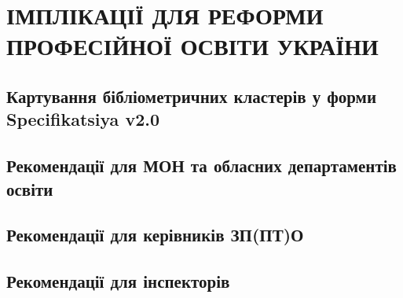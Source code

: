 
\section{\MakeUppercase{Імплікації для реформи професійної освіти України}}
\label{sec:implications}

\subsection{Картування бібліометричних кластерів у форми Specifikatsiya v2.0}
\label{sec:implications-mapping}


\subsection{Рекомендації для МОН та обласних департаментів освіти}
\label{sec:implications-mon}


\subsection{Рекомендації для керівників ЗП(ПТ)О}
\label{sec:implications-directors}


\subsection{Рекомендації для інспекторів}
\label{sec:implications-inspectors}

